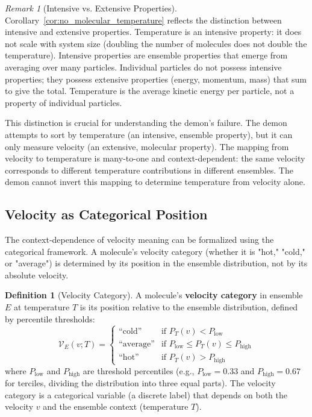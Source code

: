\documentclass[12pt,a4paper]{article}
\theoremstyle{definition}
\newtheorem{definition}[theorem]{Definition}
\theoremstyle{remark}
\newtheorem{remark}[theorem]{Remark}
\begin{document}
\begin{remark}[Intensive vs. Extensive Properties]
\label{rem:intensive_extensive}
Corollary~\ref{cor:no_molecular_temperature} reflects the distinction between intensive and extensive properties. Temperature is an intensive property: it does not scale with system size (doubling the number of molecules does not double the temperature). Intensive properties are ensemble properties that emerge from averaging over many particles. Individual particles do not possess intensive properties; they possess extensive properties (energy, momentum, mass) that sum to give the total. Temperature is the average kinetic energy per particle, not a property of individual particles.

This distinction is crucial for understanding the demon's failure. The demon attempts to sort by temperature (an intensive, ensemble property), but it can only measure velocity (an extensive, molecular property). The mapping from velocity to temperature is many-to-one and context-dependent: the same velocity corresponds to different temperature contributions in different ensembles. The demon cannot invert this mapping to determine temperature from velocity alone.
\end{remark}

\subsection{Velocity as Categorical Position}

The context-dependence of velocity meaning can be formalized using the categorical framework. A molecule's velocity category (whether it is "hot," "cold," or "average") is determined by its position in the ensemble distribution, not by its absolute velocity.

\begin{definition}[Velocity Category]
\label{def:velocity_category}
A molecule's \textbf{velocity category} in ensemble $E$ at temperature $T$ is its position relative to the ensemble distribution, defined by percentile thresholds:
\begin{equation}
\mathcal{V}_E(v; T) = \begin{cases}
\text{``cold''} & \text{if } P_T(v) < P_{\text{low}} \\
\text{``average''} & \text{if } P_{\text{low}} \leq P_T(v) \leq P_{\text{high}} \\
\text{``hot''} & \text{if } P_T(v) > P_{\text{high}}
\end{cases}
\label{eq:velocity_category}
\end{equation}
where $P_{\text{low}}$ and $P_{\text{high}}$ are threshold percentiles (e.g., $P_{\text{low}} = 0.33$ and $P_{\text{high}} = 0.67$ for terciles, dividing the distribution into three equal parts). The velocity category is a categorical variable (a discrete label) that depends on both the velocity $v$ and the ensemble context (temperature $T$).
\end{definition}
\end{document}

